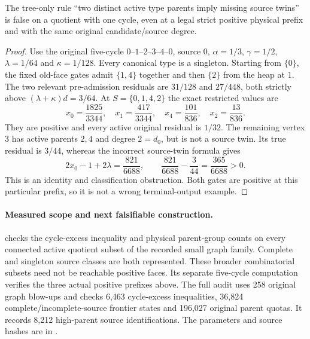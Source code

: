 \begin{proposition}
\label{prop:op3-five-cycle-source-type-ambiguity}
The tree-only rule ``two distinct active type parents imply missing source
twins'' is false on a quotient with one cycle, even at a legal strict
positive physical prefix and with the same original candidate/source degree.
\end{proposition}
\begin{proof}
Use the original five-cycle $0$--$1$--$2$--$3$--$4$--$0$, source $0$,
$\alpha=1/3$, $\gamma=1/2$, $\lambda=1/64$ and $\kappa=1/128$.
Every canonical type is a singleton. Starting from $\{0\}$, the fixed
old-face gates admit $\{1,4\}$ together and then $\{2\}$ from the heap
at $1$. The two relevant pre-admission residuals are $31/128$ and
$27/448$, both strictly above
$(\lambda+\kappa)d=3/64$.
At $S=\{0,1,4,2\}$ the exact restricted values are
\[
 x_0=\frac{1825}{3344},\quad x_1=\frac{417}{3344},\quad
 x_4=\frac{101}{836},\quad x_2=\frac{13}{836}.
\]
They are positive and every active original residual is $1/32$.
The remaining vertex $3$ has active parents $2,4$ and degree $2=d_0$,
but is not a source twin. Its true residual is $3/44$, whereas the
incorrect source-twin formula gives
\[
 2x_0-1+2\lambda=\frac{821}{6688},\qquad
 \frac{821}{6688}-\frac3{44}=\frac{365}{6688}>0.
\]
This is an identity and classification obstruction. Both gates are positive
at this particular prefix, so it is not a wrong terminal-output example.
\end{proof}

\paragraph{Measured scope and next falsifiable construction.}
 checks the cycle-excess inequality and
physical parent-group counts on every connected active quotient subset
of the recorded small graph family. Complete and singleton source classes
are both represented. These broader combinatorial subsets need not be
reachable positive faces. Its separate five-cycle computation verifies the
three actual positive prefixes above. The full audit uses 258 original graph blow-ups and checks 6,463
cycle-excess inequalities, 36,824 complete/incomplete-source frontier
states and 196,027 original parent quotas. It records 8,212 high-parent
source identifications. The parameters and source hashes are in
.

